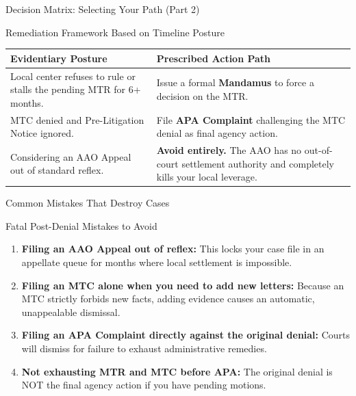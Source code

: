 \documentclass[11pt]{beamer}
\begin{document}
	\begin{frame}{Decision Matrix: Selecting Your Path (Part 2)}
		\scriptsize
		\begin{block}{Remediation Framework Based on Timeline Posture}
			\centering
			\begin{tabular}{|p{4cm}|p{6.5cm}|}
				\hline
				\textbf{Evidentiary Posture} & \textbf{Prescribed Action Path} \\
				\hline
				Local center refuses to rule or stalls the pending MTR for 6+ months. & Issue a formal \textbf{Mandamus} to force a decision on the MTR. \\
				\hline
				MTC denied and Pre-Litigation Notice ignored. & File \textbf{APA Complaint} challenging the MTC denial as final agency action. \\
				\hline
				Considering an AAO Appeal out of standard reflex. & \textbf{Avoid entirely.} The AAO has no out-of-court settlement authority and completely kills your local leverage. \\
				\hline
			\end{tabular}
		\end{block}
	\end{frame}
	
	\begin{frame}{Common Mistakes That Destroy Cases}
		\scriptsize
		\begin{block}{Fatal Post-Denial Mistakes to Avoid}
			\begin{enumerate}
				\item \textbf{Filing an AAO Appeal out of reflex:} This locks your case file in an appellate queue for months where local settlement is impossible.
				\item \textbf{Filing an MTC alone when you need to add new letters:} Because an MTC strictly forbids new facts, adding evidence causes an automatic, unappealable dismissal.
				\item \textbf{Filing an APA Complaint directly against the original denial:} Courts will dismiss for failure to exhaust administrative remedies.
				\item \textbf{Not exhausting MTR and MTC before APA:} The original denial is NOT the final agency action if you have pending motions.
			\end{enumerate}
		\end{block}
	\end{frame}
	
\end{document}
